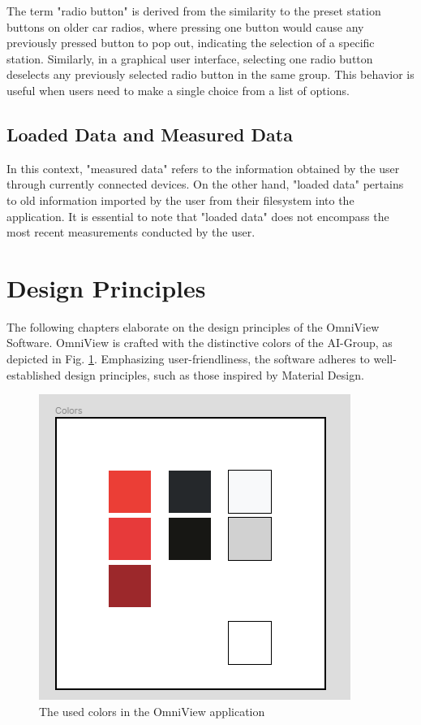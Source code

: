 \documentclass{scrreprt}
\begin{document}
The term "radio button" is derived from the similarity to the preset station buttons on older car radios, where pressing one button would cause any previously pressed button to pop out,
 indicating the selection of a specific station. Similarly, in a graphical user interface, selecting one radio button deselects any previously selected radio button in the same group. 
 This behavior is useful when users need to make a single choice from a list of options.

\subsection{Loaded Data and Measured Data}\label{cap:loadedData}
In this context, "measured data" refers to the information obtained by the user through currently connected devices. On the other hand, "loaded data" 
pertains to old information imported by the user from their filesystem into the application. It is essential to note that "loaded data" does not encompass the most recent measurements conducted by the user. 


\section{Design Principles}\label{cap:Designprinciples}

The following chapters elaborate on the design principles of the OmniView Software. OmniView is crafted with the distinctive colors of the AI-Group, as depicted in Fig. \ref{fig: AIGroupColors}. Emphasizing user-friendliness, the software adheres to well-established design principles, such as those inspired by Material Design.

\begin{figure}
    \includegraphics[width=.6\textwidth]{assets/pictures/Colors.png}
    \caption[]{The used colors in the OmniView application}
    \label{fig: AIGroupColors}
\end{figure}
\end{document}
